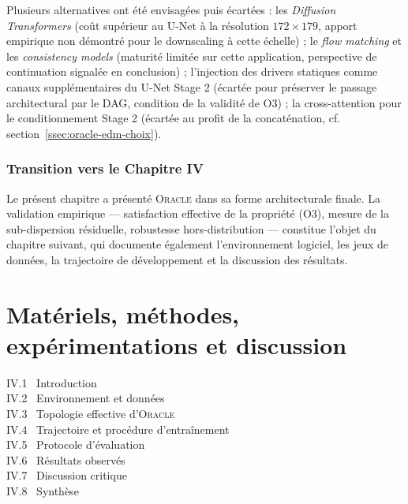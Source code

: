 \documentclass[14pt,a4paper,openany]{extreport}
\theoremstyle{definition}
\newcommand{\Oracle}{\textsc{Oracle}}
\begin{document}
Plusieurs alternatives ont été envisagées puis écartées : les \emph{Diffusion Transformers} (coût supérieur au U-Net à la résolution $172\times 179$, apport empirique non démontré pour le downscaling à cette échelle) ; le \emph{flow matching} et les \emph{consistency models} (maturité limitée sur cette application, perspective de continuation signalée en conclusion) ; l'injection des drivers statiques comme canaux supplémentaires du U-Net Stage 2 (écartée pour préserver le passage architectural par le DAG, condition de la validité de O3) ; la cross-attention pour le conditionnement Stage 2 (écartée au profit de la concaténation, cf. section~\ref{ssec:oracle-edm-choix}).

\subsection{Transition vers le Chapitre IV}
\label{ssec:oracle-transition}

Le présent chapitre a présenté \Oracle{} dans sa forme architecturale finale. La validation empirique --- satisfaction effective de la propriété (O3), mesure de la sub-dispersion résiduelle, robustesse hors-distribution --- constitue l'objet du chapitre suivant, qui documente également l'environnement logiciel, les jeux de données, la trajectoire de développement et la discussion des résultats.

\cleardoublepage



\chapter{Matériels, méthodes, expérimentations et discussion}
\label{chap:experiences}

\begin{sommairebox}
\small
\noindent IV.1 \ Introduction \dotfill \pageref{sec:exp-intro}\\
\noindent IV.2 \ Environnement et données \dotfill \pageref{sec:exp-env}\\
\noindent IV.3 \ Topologie effective d'\Oracle{} \dotfill \pageref{sec:exp-topo}\\
\noindent IV.4 \ Trajectoire et procédure d'entraînement \dotfill \pageref{sec:exp-traj}\\
\noindent IV.5 \ Protocole d'évaluation \dotfill \pageref{sec:exp-protoc}\\
\noindent IV.6 \ Résultats observés \dotfill \pageref{sec:exp-resultats}\\
\noindent IV.7 \ Discussion critique \dotfill \pageref{sec:exp-discussion}\\
\noindent IV.8 \ Synthèse \dotfill \pageref{sec:exp-synthese}
\end{sommairebox}
\end{document}
